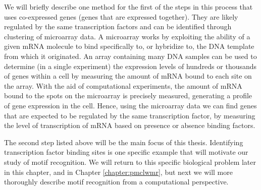 We will briefly describe one method for the first of the steps in this process that uses co-expressed genes (genes that are expressed together). They are likely regulated by the same transcription factors and can be identified through clustering of microarray data. A microarray works by exploiting the ability of a given mRNA molecule to bind specifically to, or hybridize to, the DNA template from which it originated. An array containing many DNA samples can be used to determine (in a single experiment) the expression levels of hundreds or thousands of genes within a cell by measuring the amount of mRNA bound to each site on the array. With the aid of computational experiments, the amount of mRNA bound to the spots on the microarray is precisely measured, generating a profile of gene expression in the cell. Hence, using the microarray data we can find genes that are expected to be regulated by the same transcription factor, by measuring the level of transcription of mRNA based on presence or absence binding factors.

The second step listed above will be the main focus of this thesis.  Identifying transcription factor binding sites is one specific example that will motivate our study of motif recognition. We will return to this specific biological problem later in this chapter, and in Chapter \ref{chapter:pmclwmr}, but next we will more thoroughly describe motif recognition from a computational perspective.



